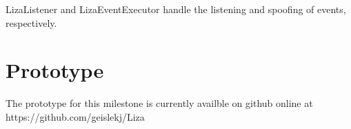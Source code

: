 \documentclass{article}
\begin{document}
\noindent
LizaListener and LizaEventExecutor handle the listening and spoofing of
events, respectively. 
\newline

\newpage


\newpage
\section{Prototype}

The prototype for this milestone is currently availble on github online at
https://github.com/geislekj/Liza
\end{document}
